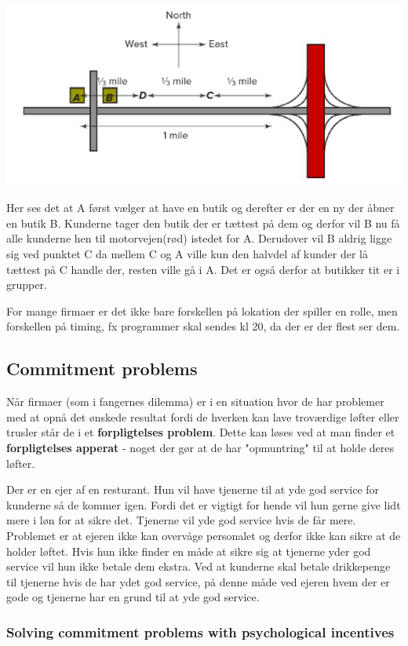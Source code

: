 \begin{eks} %
\newline
\includegraphics[scale=0.6]{Afsnit/Lektion5/motorvej.png}

Her ses det at A først vælger at have en butik og derefter er der en ny der åbner en butik B. Kunderne tager den butik der er tættest på dem og derfor vil B nu få alle kunderne hen til motorvejen(rød) istedet for A. Derudover vil B aldrig ligge sig ved punktet C da mellem C og A ville kun den halvdel af kunder der lå tættest på C handle der, resten ville gå i A. Det er også derfor at butikker tit er i grupper. 
\end{eks}

For mange firmaer er det ikke bare forskellen på lokation der spiller en rolle, men forskellen på timing, fx programmer skal sendes kl 20, da der er der flest ser dem. 

\subsection{Commitment problems}
Når firmaer (som i fangernes dilemma) er i en situation hvor de har problemer med at opnå det ønskede resultat fordi de hverken kan lave troværdige løfter eller trusler står de i et \textbf{forpligtelses problem}. Dette kan løses ved at man finder et \textbf{forpligtelses apperat} - noget der gør at de har "opmuntring" til at holde deres løfter. 

\begin{eks} \textbf{} %
\newline
Der er en ejer af en resturant. Hun vil have tjenerne til at yde god service for kunderne så de kommer igen. Fordi det er vigtigt for hende vil hun gerne give lidt mere i løn for at sikre det. Tjenerne vil yde god service hvis de får mere. Problemet er at ejeren ikke kan overvåge personalet og derfor ikke kan sikre at de holder løftet. Hvis hun ikke finder en måde at sikre sig at tjenerne yder god service vil hun ikke betale dem ekstra. Ved at kunderne skal betale drikkepenge til tjenerne hvis de har ydet god service, på denne måde ved ejeren hvem der er gode og tjenerne har en grund til at yde god service.  
\end{eks}

\subsubsection{Solving commitment problems with psychological incentives}








